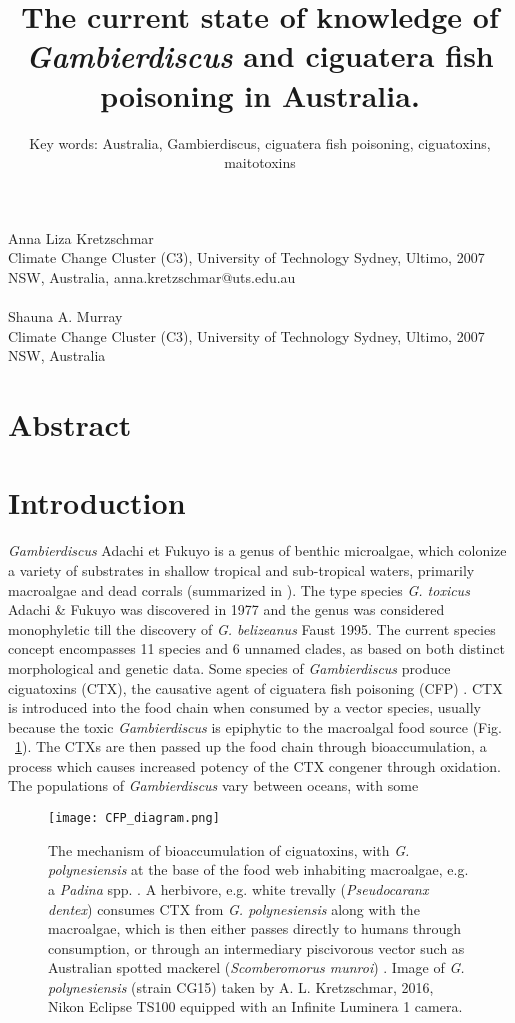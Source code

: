 \documentclass[12pt]{article}
\title{The current state of knowledge of \emph{Gambierdiscus} and ciguatera fish poisoning in Australia.}
\author{Key words: Australia, Gambierdiscus, ciguatera fish poisoning, ciguatoxins, maitotoxins}
\date{}
\begin{document}
\maketitle
\paragraph{}Anna Liza Kretzschmar\\
Climate Change Cluster (C3), University of Technology Sydney, Ultimo, 2007 NSW, Australia, anna.kretzschmar@uts.edu.au
\paragraph{}Shauna A. Murray\\
Climate Change Cluster (C3), University of Technology Sydney, Ultimo, 2007 NSW, Australia
\newpage
\section*{Abstract}


\section*{Introduction}
\textit{Gambierdiscus} Adachi et Fukuyo is a genus of benthic microalgae, which colonize a variety of substrates in shallow tropical and sub-tropical waters, primarily macroalgae and dead corrals (summarized in \cite{hoppenrath2014marine}).
The type species \emph{G. toxicus} Adachi \& Fukuyo was discovered in 1977 and the genus was considered monophyletic till the discovery of \emph{G. belizeanus} Faust 1995. The current species concept encompasses 11 species and 6 unnamed clades, as based on both distinct morphological and genetic data.
Some species of \emph{Gambierdiscus} produce ciguatoxins (CTX), the causative agent of ciguatera fish poisoning (CFP) \cite{berdalet2012global}. CTX is introduced into the food chain when consumed by a vector species, usually because the toxic \emph{Gambierdiscus} is epiphytic to the macroalgal food source (Fig. ~\ref{fig:bioacc}). The CTXs are then passed up the food chain through bioaccumulation, a process which causes increased potency of the CTX congener through oxidation.
The populations of \emph{Gambierdiscus} vary between oceans, with some 

\FloatBarrier
\begin{figure} 
\texttt{[image: CFP\_diagram.png]} 
\caption{The mechanism of bioaccumulation of ciguatoxins, with \emph{G. polynesiensis} at the base of the food web inhabiting macroalgae, e.g. a \emph{Padina} spp. \cite{padina}. A herbivore, e.g. white trevally (\emph{Pseudocaranx dentex}) \cite{trevally} consumes CTX from \emph{G. polynesiensis} along with the macroalgae, which is then either passes directly to humans through consumption, or through an intermediary piscivorous vector such as Australian spotted mackerel (\emph{Scomberomorus munroi}) \cite{mackerel}. Image of \emph{G. polynesiensis} (strain CG15) taken by A. L. Kretzschmar, 2016, Nikon Eclipse TS100 equipped with an Infinite Luminera 1 camera.} 
\label{fig:bioacc}
\end{figure} 
\FloatBarrier
\end{document}
